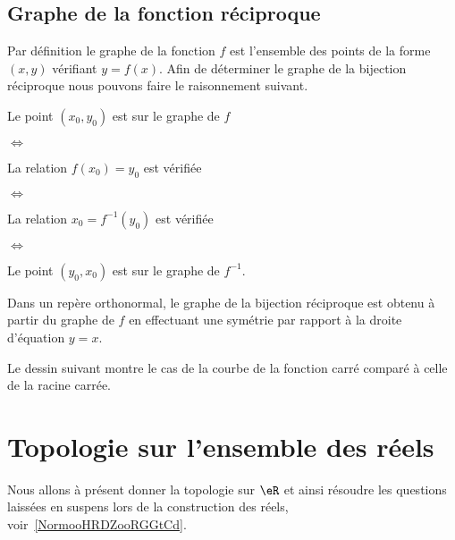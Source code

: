 \subsection{Graphe de la fonction réciproque}

Par définition le graphe de la fonction \( f\) est l'ensemble des points de la forme \( (x,y)\) vérifiant \( y=f(x)\). Afin de déterminer le graphe de la bijection réciproque nous pouvons faire le raisonnement suivant.

Le point \( (x_0,y_0)\) est sur le graphe de \( f\)

\noindent\( \Leftrightarrow\)

La relation \( f(x_0)=y_0\) est vérifiée

\noindent\( \Leftrightarrow\)

La relation \( x_0=f^{-1}(y_0)\) est vérifiée

\noindent\( \Leftrightarrow\)

Le point \( (y_0,x_0)\) est sur le graphe de \( f^{-1}\).

\begin{Aretenir}
	Dans un repère orthonormal, le graphe de la bijection réciproque est obtenu à partir du graphe de \( f\) en effectuant une symétrie par rapport à la droite d'équation \( y=x\).
\end{Aretenir}

Le dessin suivant montre le cas de la courbe de la fonction carré comparé à celle de la racine carrée.
\begin{center}
	
\end{center}

\section{Topologie sur l'ensemble des réels}
\label{SECooGKHYooMwHQaD}

Nous allons à présent donner la topologie sur \( \eR\) et ainsi résoudre les questions laissées en suspens lors de la construction des réels, voir~\ref{NormooHRDZooRGGtCd}.

